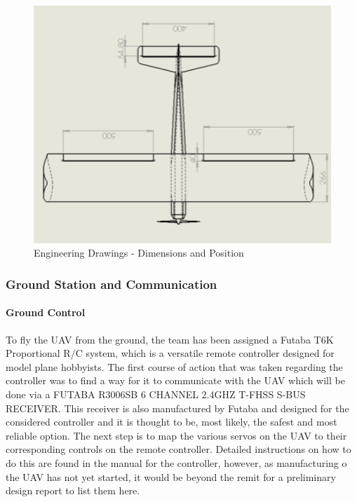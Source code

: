 \documentclass[12pt]{article}
\begin{document}
\begin{figure}[h!]
    \includegraphics[width=14.5cm, scale=1]{drawing1.png}
    \caption{Engineering Drawings - Dimensions and Position}
\end{figure}

\newpage

\subsubsection{Ground Station and Communication}

\paragraph{Ground Control} To fly the UAV from the ground, the team has been assigned a Futaba T6K Proportional R/C system, which is a versatile remote controller designed for model plane hobbyists. The first course of action that was taken regarding the controller was to find a way for it to communicate with the UAV which will be done via a FUTABA R3006SB 6 CHANNEL 2.4GHZ T-FHSS S-BUS RECEIVER. This receiver is also manufactured by Futaba and designed for the considered controller and it is thought to be, most likely, the safest and most reliable option. The next step is to map the various servos on the UAV to their corresponding controls on the remote controller. Detailed instructions on how to do this are found in the manual for the controller, however, as manufacturing o the UAV has not yet started, it would be beyond the remit for a preliminary design report to list them here. \\
\end{document}
